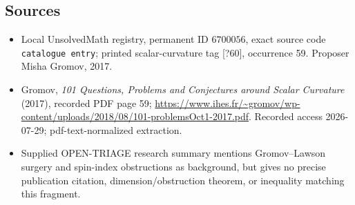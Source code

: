 \documentclass[11pt]{article}
\begin{document}
\subsection{Sources}
\begin{itemize}
\item Local UnsolvedMath registry, permanent ID \(6700056\), exact source code \texttt{catalogue entry}; printed scalar-curvature tag [?60], occurrence 59. Proposer Misha Gromov, 2017.
\item Gromov, \emph{101 Questions, Problems and Conjectures around Scalar Curvature} (2017), recorded PDF page 59; \url{https://www.ihes.fr/~gromov/wp-content/uploads/2018/08/101-problemsOct1-2017.pdf}. Recorded access 2026-07-29; pdf-text-normalized extraction.
\item Supplied OPEN-TRIAGE research summary mentions Gromov--Lawson surgery and spin-index obstructions as background, but gives no precise publication citation, dimension/obstruction theorem, or inequality matching this fragment.
\end{itemize}
\end{document}
